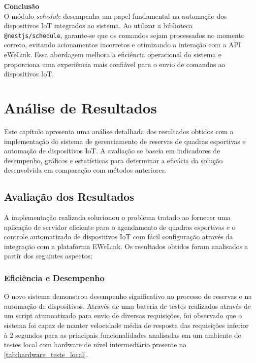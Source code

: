 \textbf{Conclusão}\\
O módulo \textit{schedule} desempenha um papel fundamental na automação dos dispositivos IoT integrados ao sistema. Ao utilizar a biblioteca \texttt{@nestjs/schedule}, garante-se que os comandos sejam processados no momento correto, evitando acionamentos incorretos e otimizando a interação com a API eWeLink. Essa abordagem melhora a eficiência operacional do sistema e proporciona uma experiência mais confiável para o envio de comandos ao dispositivos IoT.

\section{Análise de Resultados}\label{sec:analise_resultados}

Este capítulo apresenta uma análise detalhada dos resultados obtidos com a implementação do sistema de gerenciamento de reservas de quadras esportivas e automação de dispositivos IoT. A avaliação se baseia em indicadores de desempenho, gráficos e estatísticas para determinar a eficácia da solução desenvolvida em comparação com métodos anteriores.

\subsection{Avaliação dos Resultados}

A implementação realizada solucionou o problema tratado ao fornecer uma aplicação de servidor eficiente para o agendamento de quadras esportivas e o controle automatizado de dispositivos IoT com fácil configuração através da integração com a plataforma EWeLink. Os resultados obtidos foram analisados a partir dos seguintes aspectos:

\subsubsection{Eficiência e Desempenho}

O novo sistema demonstrou desempenho significativo no processo de reservas e na automação de dispositivos. Através de uma bateria de testes realizados através de um script atumoatizado para envio de diversas requisições, foi observado que o sistema foi capaz de manter velocidade média de resposta das requisições inferior à 2 segundos para as principais funcionalidades analisadas em um ambiente de testes local com hardware de nível intermediário presente na \autoref{tab:hardware_teste_local}.

